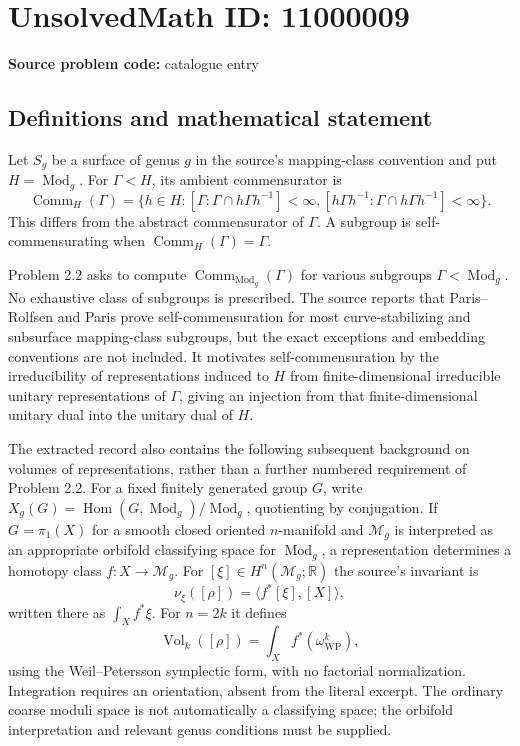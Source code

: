 \documentclass[11pt]{article}
\newcommand{\R}{\mathbb{R}}
\begin{document}
\section*{UnsolvedMath ID: 11000009}
\textbf{Source problem code:} catalogue entry
\subsection{Definitions and mathematical statement}
Let $S_g$ be a surface of genus $g$ in the source's mapping-class convention and put $H=\operatorname{Mod}_g$. For $\Gamma<H$, its ambient commensurator is
\[
 \operatorname{Comm}_H(\Gamma)=
 \{h\in H:[\Gamma:\Gamma\cap h\Gamma h^{-1}]<\infty,
 [h\Gamma h^{-1}:\Gamma\cap h\Gamma h^{-1}]<\infty\}.
\]
This differs from the abstract commensurator of $\Gamma$. A subgroup is self-commensurating when $\operatorname{Comm}_H(\Gamma)=\Gamma$.

Problem 2.2 asks to compute $\operatorname{Comm}_{\operatorname{Mod}_g}(\Gamma)$ for various subgroups $\Gamma<\operatorname{Mod}_g$. No exhaustive class of subgroups is prescribed. The source reports that Paris--Rolfsen and Paris prove self-commensuration for most curve-stabilizing and subsurface mapping-class subgroups, but the exact exceptions and embedding conventions are not included. It motivates self-commensuration by the irreducibility of representations induced to $H$ from finite-dimensional irreducible unitary representations of $\Gamma$, giving an injection from that finite-dimensional unitary dual into the unitary dual of $H$.

The extracted record also contains the following subsequent background on volumes of representations, rather than a further numbered requirement of Problem 2.2. For a fixed finitely generated group $G$, write $X_g(G)=\operatorname{Hom}(G,\operatorname{Mod}_g)/\operatorname{Mod}_g$, quotienting by conjugation. If $G=\pi_1(X)$ for a smooth closed oriented $n$-manifold and $\mathcal M_g$ is interpreted as an appropriate orbifold classifying space for $\operatorname{Mod}_g$, a representation determines a homotopy class $f:X\to\mathcal M_g$. For $[\xi]\in H^n(\mathcal M_g;\R)$ the source's invariant is
\[
 \nu_\xi([\rho])=\langle f^*[\xi],[X]\rangle,
\]
written there as $\int_X f^*\xi$. For $n=2k$ it defines
\[
 \operatorname{Vol}_k([\rho])=\int_X f^*(\omega_{\mathrm{WP}}^k),
\]
using the Weil--Petersson symplectic form, with no factorial normalization. Integration requires an orientation, absent from the literal excerpt. The ordinary coarse moduli space is not automatically a classifying space; the orbifold interpretation and relevant genus conditions must be supplied.
\end{document}
